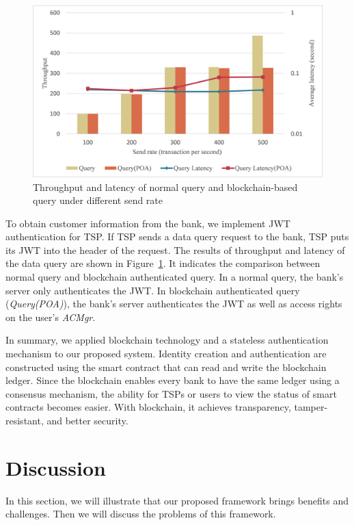 \begin{figure}[htb]
    \centering
    \includegraphics[height=!,width=1\linewidth,keepaspectratio=true]{figures/query.png}
    \caption{{\footnotesize Throughput and latency of normal query and blockchain-based query under different send rate}}
    \label{fig:query}
\end{figure}
To obtain customer information from the bank, we implement JWT authentication for TSP. If TSP sends a data query request to the bank, TSP puts its JWT into the header of the request. The results of throughput and latency of the data query are shown in Figure~\ref{fig:query}. It indicates the comparison between normal query and blockchain authenticated query. In a normal query, the bank's server only authenticates the JWT. In blockchain authenticated query (\textit{Query(POA)}), the bank's server authenticates the JWT as well as access rights on the user's \textit{ACMgr}.
\par 
In summary, we applied blockchain technology and a stateless authentication mechanism to our proposed system. Identity creation and authentication are constructed using the smart contract that can read and write the blockchain ledger. Since the blockchain enables every bank to have the same ledger using a consensus mechanism, the ability for TSPs or users to view the status of smart contracts becomes easier. With blockchain, it achieves transparency, tamper-resistant, and better security.

\newpage
\section{Discussion}
In this section, we will illustrate that our proposed framework brings benefits and challenges. Then we will discuss the problems of this framework.
\par


